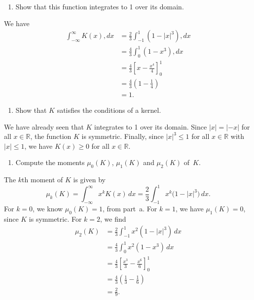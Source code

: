 \documentclass[
  a4paper,
]{article}
\providecommand{\tightlist}{%
  \setlength{\itemsep}{0pt}\setlength{\parskip}{0pt}}
\theoremstyle{definition}
\theoremstyle{definition}
\theoremstyle{definition}
\theoremstyle{definition}
\theoremstyle{remark}
\begin{document}
\begin{enumerate}
\def\labelenumi{\alph{enumi}.}
\tightlist
\item
  Show that this function integrates to 1 over its domain.
\end{enumerate}

\begin{myanswers}
We have
\begin{align*}
    \int_{-\infty}^{\infty} K(x) , dx
    &= \frac23 \int_{-1}^1 (1 - |x|^3) , dx \\
    &= \frac43  \int_0^1 (1 - x^3) , dx \\
    &= \frac43  \left[ x - \frac{x^4}{4} \right]_0^1 \\
    &= \frac43  \left( 1 - \frac{1}{4} \right) \\
    &= 1.
  \end{align*}

\end{myanswers}

\begin{enumerate}
\def\labelenumi{\alph{enumi}.}
\setcounter{enumi}{1}
\tightlist
\item
  Show that \(K\) satisfies the conditions of a kernel.
\end{enumerate}

\begin{myanswers}
We have already seen that \(K\) integrates to 1 over its domain.
Since \(|x| = |-x|\) for all \(x\in\mathbb{R}\), the function \(K\) is symmetric.
Finally, since \(|x|^3 \leq 1\) for all \(x\in\mathbb{R}\) with \(|x|\leq 1\), we have
\(K(x) \geq 0\) for all \(x\in\mathbb{R}\).

\end{myanswers}

\begin{enumerate}
\def\labelenumi{\alph{enumi}.}
\setcounter{enumi}{2}
\tightlist
\item
  Compute the moments \(\mu_0(K)\), \(\mu_1(K)\) and
  \(\mu_2(K)\) of~\(K\).
\end{enumerate}

\begin{myanswers}
The \(k\)th moment of \(K\) is given by
\begin{equation*}
  \mu_k(K)
  = \int_{-\infty}^\infty x^k K(x) \,dx
  = \frac23 \int_{-1}^1 x^k \bigl( 1 - |x|^3 \bigr) \,dx.
\end{equation*}
For \(k = 0\), we know \(\mu_0(K) = 1\), from part~a.
For \(k = 1\), we have \(\mu_1(K) = 0\), since \(K\) is symmetric.
For \(k = 2\), we find
\begin{align*}
  \mu_2(K)
  &= \frac23 \int_{-1}^1 x^2 (1 - |x|^3) \,dx \\
  &= \frac43 \int_0^1 x^2 (1 - x^3) \,dx \\
  &= \frac43 \left[ \frac{x^3}{3} - \frac{x^6}{6} \right]_0^1 \\
  &= \frac43 \left( \frac13 - \frac16 \right) \\
  &= \frac29.
\end{align*}

\end{myanswers}
\end{document}
